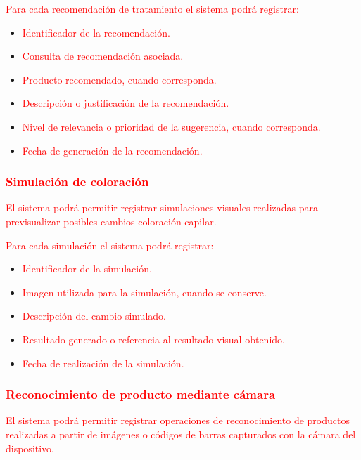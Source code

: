 \textcolor{red}{Para cada recomendación de tratamiento el sistema podrá registrar:}

\begin{itemize}
    \item \textcolor{red}{Identificador de la recomendación.}
    \item \textcolor{red}{Consulta de recomendación asociada.}
    \item \textcolor{red}{Producto recomendado, cuando corresponda.}
    \item \textcolor{red}{Descripción o justificación de la recomendación.}
    \item \textcolor{red}{Nivel de relevancia o prioridad de la sugerencia, cuando corresponda.}
    \item \textcolor{red}{Fecha de generación de la recomendación.}
\end{itemize}

\subsubsection*{\textcolor{red}{Simulación de coloración}}

\textcolor{red}{El sistema podrá permitir registrar simulaciones visuales realizadas para previsualizar posibles cambios coloración capilar.}

\textcolor{red}{Para cada simulación el sistema podrá registrar:}

\begin{itemize}
    \item \textcolor{red}{Identificador de la simulación.}
    \item \textcolor{red}{Imagen utilizada para la simulación, cuando se conserve.}
    \item \textcolor{red}{Descripción del cambio simulado.}
    \item \textcolor{red}{Resultado generado o referencia al resultado visual obtenido.}
    \item \textcolor{red}{Fecha de realización de la simulación.}
\end{itemize}

\subsubsection*{\textcolor{red}{Reconocimiento de producto mediante cámara}}

\textcolor{red}{El sistema podrá permitir registrar operaciones de reconocimiento de productos realizadas a partir de imágenes o códigos de barras capturados con la cámara del dispositivo.}

